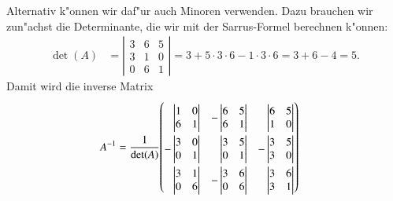Alternativ k"onnen wir daf"ur auch Minoren verwenden.
Dazu brauchen wir zun"achst die Determinante, die wir mit der Sarrus-Formel
berechnen k"onnen:
\begin{align*}
\det(A)
&
=
\left|
\begin{matrix}
3&6&5\\
3&1&0\\
0&6&1
\end{matrix}
\right|
=
3+5\cdot3\cdot6-1\cdot3\cdot 6
=
3+6-4=5.
\end{align*}
Damit wird die inverse Matrix
\begin{align*}
A^{-1}
&=
\frac1{\det(A)}
{
\def\arraystretch{2.2}
\begin{pmatrix}
\def\arraystretch{1}
\phantom{-}
\left|\begin{matrix} 1&0\\6&1 \end{matrix}\right|&
\def\arraystretch{1}
-
\left|\begin{matrix} 6&5\\6&1 \end{matrix}\right|&
\def\arraystretch{1}
\phantom{-}
\left|\begin{matrix} 6&5\\1&0 \end{matrix}\right|
\\
\def\arraystretch{1}
-
\left|\begin{matrix} 3&0\\0&1 \end{matrix}\right|&
\def\arraystretch{1}
\phantom{-}
\left|\begin{matrix} 3&5\\0&1 \end{matrix}\right|&
\def\arraystretch{1}
-
\left|\begin{matrix} 3&5\\3&0 \end{matrix}\right|
\\
\def\arraystretch{1}
\phantom{-}
\left|\begin{matrix} 3&1\\0&6 \end{matrix}\right|&
\def\arraystretch{1}
-
\left|\begin{matrix} 3&6\\0&6 \end{matrix}\right|&
\def\arraystretch{1}
\phantom{-}
\left|\begin{matrix} 3&6\\3&1 \end{matrix}\right|

\end{pmatrix}}
\end{align*}
